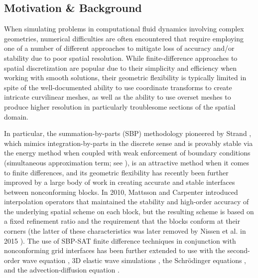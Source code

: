 \subsection{Motivation \& Background} \label{sec:hybrid_goals}


When simulating problems in computational fluid dynamics involving complex
geometries, numerical difficulties are often encountered that require
employing one of a number of different approaches to mitigate loss of accuracy and/or stability
due to poor spatial resolution. While finite-difference approaches to spatial
discretization are popular due to their simplicity and efficiency when working
with smooth solutions, their geometric flexibility is typically limited in spite
of the well-documented ability to use coordinate transforms to create intricate
curvilinear meshes, as well as the ability to use overset meshes \cite{bodony2011provably, noack2005summary}
to produce higher resolution in particularly troublesome sections of the spatial domain.

In particular, the summation-by-parts (SBP) methodology pioneered by Strand \cite{strand1994summation},
which mimics
integration-by-parts in the discrete sense and is provably stable via the energy method when coupled with weak enforcement of boundary conditions (simultaneous approximation term; see \cite{svard2007stable}),
is an attractive method when it comes to finite differences, and its geometric
flexibility has recently been further improved by a large body of work in creating
accurate and stable interfaces between nonconforming blocks. In 2010, Mattsson and
Carpenter \cite{mattsson2010stable} introduced interpolation operators that maintained
the stability and high-order accuracy of the underlying spatial scheme on each block,
but the resulting scheme is based on a fixed refinement ratio and the requirement that
the blocks conform at their corners (the latter of these characteristics was
later removed by Nissen et al. in 2015 \cite{nissen2015stable}). The use of SBP-SAT finite
difference techniques in conjunction with nonconforming grid interfaces has been further
extended to use with the second-order wave equation \cite{wang2016high}, 3D elastic wave
simulations \cite{gao2020energy}, the Schr{\"o}dinger equations \cite{nissen2012stability},
and the advection-diffusion equation \cite{lundquist2018hybrid}. 

